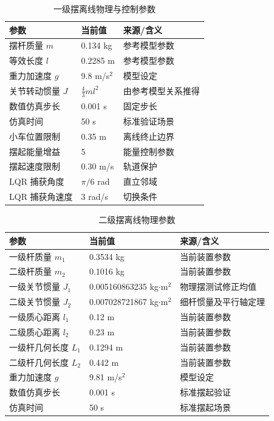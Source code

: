\documentclass[12pt,a4paper]{article}
\begin{document}
\begin{table}[htbp]
    \centering
    \caption{一级摆离线物理与控制参数}
    \label{tab:singlephysical}
    \renewcommand{\arraystretch}{1.3}
    \begin{tabular}{@{}p{5.8cm}p{4.0cm}p{4.5cm}@{}}
        \toprule
        \textbf{参数} & \textbf{当前值} & \textbf{来源/含义} \\
        \midrule
        摆杆质量 $m$ & 0.134 kg & 参考模型参数 \\
        等效长度 $l$ & 0.2285 m & 参考模型参数 \\
        重力加速度 $g$ & 9.8 m/s$^2$ & 模型设定 \\
        关节转动惯量 $J$ & $\frac{4}{3}ml^2$ & 由参考模型关系推得 \\
        数值仿真步长 & 0.001 s & 固定步长 \\
        仿真时间 & 50 s & 标准验证场景 \\
        小车位置限制 & 0.35 m & 离线终止边界 \\
        摆起能量增益 & 5 & 能量控制参数 \\
        摆起速度限制 & 0.30 m/s & 轨道保护 \\
        LQR 捕获角度 & $\pi/6$ rad & 直立邻域 \\
        LQR 捕获角速度 & 3 rad/s & 切换条件 \\
        \bottomrule
    \end{tabular}
\end{table}

\begin{table}[htbp]
    \centering
    \caption{二级摆离线物理参数}
    \label{tab:doublephysical}
    \renewcommand{\arraystretch}{1.3}
    \begin{tabular}{@{}p{5.8cm}p{4.0cm}p{4.5cm}@{}}
        \toprule
        \textbf{参数} & \textbf{当前值} & \textbf{来源/含义} \\
        \midrule
        一级杆质量 $m_1$ & 0.3534 kg & 当前装置参数 \\
        二级杆质量 $m_2$ & 0.1016 kg & 当前装置参数 \\
        一级关节惯量 $J_1$ & 0.005160863235 kg$\cdot$m$^2$ & 物理摆测试修正均值 \\
        二级关节惯量 $J_2$ & 0.007028721867 kg$\cdot$m$^2$ & 细杆惯量及平行轴定理 \\
        一级质心距离 $l_1$ & 0.12 m & 当前装置参数 \\
        二级质心距离 $l_2$ & 0.23 m & 当前装置参数 \\
        一级杆几何长度 $L_1$ & 0.1294 m & 当前装置参数 \\
        二级杆几何长度 $L_2$ & 0.442 m & 当前装置参数 \\
        重力加速度 $g$ & 9.81 m/s$^2$ & 模型设定 \\
        数值仿真步长 & 0.001 s & 标准摆起验证 \\
        仿真时间 & 50 s & 标准摆起场景 \\
        \bottomrule
    \end{tabular}
\end{table}
\end{document}
